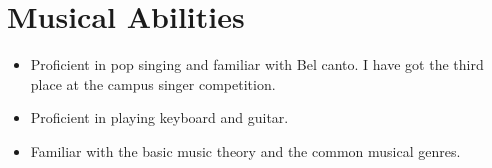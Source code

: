 \documentclass{resume}
\begin{document}
\section{Musical Abilities}
\begin{itemize}
  \item Proficient in pop singing and familiar with Bel canto. I have got the third place at the campus singer competition.
  \item Proficient in playing keyboard and guitar.
  \item Familiar with the basic music theory and the common musical genres.
\end{itemize}
\end{document}
